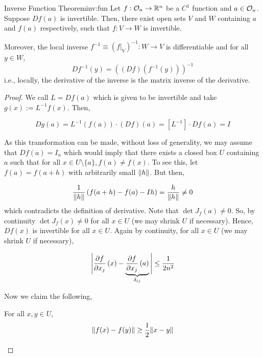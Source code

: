 \documentclass[../Analysis-3.tex]{subfiles}
\begin{document}
\begin{Thm}{Inverse Function Theorem}{inv:fun}
  Let $ f:\mathcal{O}_{n} \to \mathbb{R}^n $ be a $ C^1 $ function and $ a \in \mathcal{O}_{n} $. Suppose $ Df(a) $ is invertible. Then, there exist open sets $ V $ and $ W $ containing $ a $ and $ f(a) $ respectively, such that $ f: V \to W $ is invertible.

  \;

  Moreover, the local inverse $ f^{-1} \equiv \left( f\vert_V \right)^{-1} : W \to V $ is differentiable and for all $ y \in W $,
  \[ Df^{-1}(y) = \left( \left( Df \right)\left( f^{-1}(y) \right) \right)^{-1} \]
  i.e., locally, the derivative of the inverse is the matrix inverse of the derivative.
\end{Thm}

\begin{proof}
  We call $ L = Df(a) $ which is given to be invertible and take $ g(x) := L^{-1}f(x) $. Then,

  \[  Dg(a) = L^{-1}(f(a))\cdot (Df)(a) = \left[ L^{-1} \right]\cdot Df(a) = I  \]

  As this transformation can be made, without loss of generality, we may assume that $ Df(a) = I_n $ which would imply that there exists a closed box $ U $ containing $ a $ such that for all $ x\in U\setminus\{a\}, f(a) \not= f(x) $. To see this, let $ f(a) = f(a+h) $ with arbitrarily small $ \norm{h} $. But then,

  \[\frac{1}{\norm{h}}\left( f(a+h)-f(a)-Ih \right) = \frac{h}{\norm{h}} \not= 0\]
  which contradicts the definition of derivative. Note that $ \det J_f(a) \not= 0 $. So, by continuity $ \det J_f(x) \not= 0 $ for all $ x \in U $ (we may shrink $ U $ if necessary). Hence, $ Df(x) $ is invertible for all $ x \in U $. Again by continuity, for all $ x \in U $ (we may shrink $ U $ if necessary),

  \[  \Bigg\vert \pdv{f}{x_j}\left( x \right) - \underbrace{\pdv{f}{x_j}\left( a \right)}_{\delta_{ij}} \Bigg\vert \leq \frac{1}{2n^2}  \]

  Now we claim the following,
  \begin{clmBox}
    For all $ x, y \in U $,
    \[  \norm{f(x)-f(y)} \geq \frac{1}{2}\norm{x-y}  \]
  \end{clmBox}


\end{proof}
\end{document}
